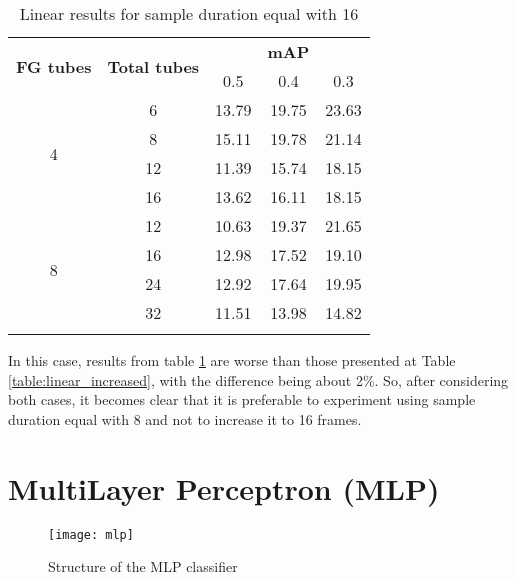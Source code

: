 \begin{center}
  \begin{longtable}{|| c | c || c c c ||}
    \hline
    \multirow{2}{*}{\textbf{FG tubes}} & \multirow{2}{*}{\textbf{Total tubes}} & {} & \textbf{mAP} & {} \\
    {} & {} & 0.5 & 0.4 & 0.3 \\
    \hline
    \multirow{4}{*}{4} & 6 & 13.79 & 19.75 & 23.63 \\
    \cline{2-5}
    {} & 8 & 15.11 & 19.78 & 21.14 \\
    \cline{2-5}
    {} & 12 & 11.39 & 15.74 & 18.15 \\
    \cline{2-5}
    {} & 16 & 13.62 & 16.11 & 18.15 \\
    \hline
    \multirow{4}{*}{8} & 12 & 10.63 & 19.37 & 21.65 \\
    \cline{2-5}
    {} & 16 & 12.98 & 17.52 & 19.10 \\
    \cline{2-5}
    {} & 24 & 12.92 & 17.64 & 19.95 \\
    \cline{2-5}
    {} & 32 & 11.51 & 13.98 & 14.82 \\
    \hline

  \caption{Linear results for sample duration equal with 16}
  \label{table:linear_16}
\end{longtable}
\end{center}


In this case, results from table \ref{table:linear_16} are worse than  those presented at Table \ref{table:linear_increased}, with the difference being about 2\%.
So, after considering both cases, it becomes clear that it is preferable to experiment using sample duration equal with 8 and not to increase it to 16 frames.


\section{MultiLayer Perceptron (MLP)}

\begin{figure}[h]
  \centering
  \texttt{[image: mlp]}
  \caption{Structure of the MLP classifier}
  \label{fig:mlp_structure}
\end{figure}

